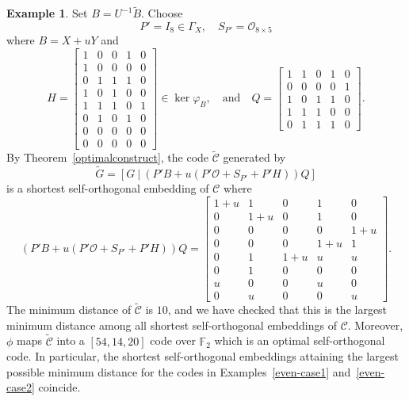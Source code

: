 \documentclass{article}
\theoremstyle{definition}
\newtheorem{example}{Example}[section]
\theoremstyle{remark}
\begin{document}
\begin{example}
    Set $B=U^{-1}\tilde{B}$. Choose
    \[
    P'=I_8\in \Gamma_X,\quad S_{P'}=\mathcal{O}_{8\times 5}
    \]
    where $B=X+uY$ and
    \[
    H=\begin{bmatrix}
    1 & 0 & 0 & 1 & 0\\
    1 & 0 & 0 & 0 & 0\\
    0 & 1 & 1 & 1 & 0\\
    1 & 0 & 1 & 0 & 0\\
    1 & 1 & 1 & 0 & 1\\
    0 & 1 & 0 & 1 & 0\\
    0 & 0 & 0 & 0 & 0\\
    0 & 0 & 0 & 0 & 0
    \end{bmatrix}\in \ker\varphi_{B},\quad\mbox{and}\quad
    Q=\begin{bmatrix}
    1 & 1 & 0 & 1 & 0\\
    0 & 0 & 0 & 0 & 1\\
    1 & 0 & 1 & 1 & 0\\
    1 & 1 & 1 & 0 & 0\\
    0 & 1 & 1 & 1 & 0
    \end{bmatrix}.
    \]
    By Theorem~\ref{optimalconstruct}, the code $\tilde{\mathcal{C}}$ generated by
    \[
    \tilde{G}=[G~|~(P'B+u(P'\mathcal{O}+S_{P'}+P'H))Q]
    \]
    is a shortest self-orthogonal embedding of $\mathcal{C}$
    where
    \[
    (P'B+u(P'\mathcal{O}+S_{P'}+P'H))Q=
    \begin{bmatrix}
    1+u & 1 & 0 & 1 & 0\\
    0 & 1+u & 0 & 1 & 0\\
    0 & 0 & 0 & 0 & 1+u\\
    0 & 0 & 0 & 1+u & 1\\
    0 & 1 & 1+u & u & u\\
    0 & 1 & 0 & 0 & 0\\
    u & 0 & 0 & u & 0\\
    0 & u & 0 & 0 & u
    \end{bmatrix}.
    \]
    The minimum distance of $\tilde{\mathcal{C}}$ is $10$, and we have checked that this is the largest minimum distance among all shortest self-orthogonal embeddings of $\mathcal{C}$. Moreover, $\phi$ maps $\tilde{\mathcal{C}}$ into a $[54, 14, 20]$ code over $\mathbb{F}_2$ which is an optimal self-orthogonal code. In particular, the shortest self-orthogonal embeddings attaining the largest possible minimum distance for the codes in Examples~\ref{even-case1} and~\ref{even-case2} coincide.
\end{example}
\end{document}

